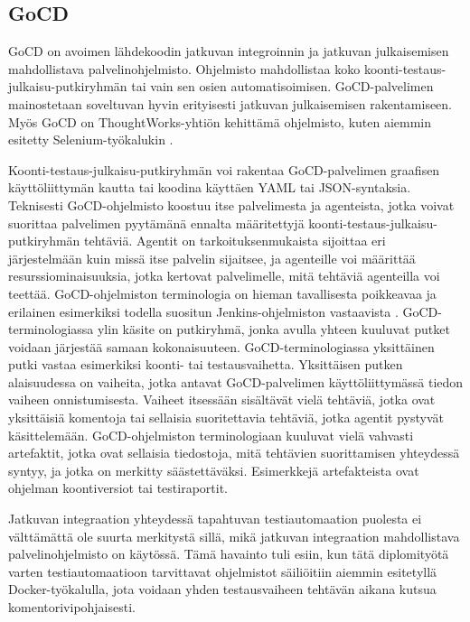   \subsection{GoCD} \label{ch:08_gocd}

    GoCD on avoimen lähdekoodin jatkuvan integroinnin ja jatkuvan julkaisemisen mahdollistava palvelinohjelmisto.
    Ohjelmisto mahdollistaa koko koonti-testaus-julkaisu-putkiryhmän tai vain sen osien automatisoimisen.
    GoCD-palvelimen mainostetaan soveltuvan hyvin erityisesti jatkuvan julkaisemisen rakentamiseen.
    Myös GoCD on ThoughtWorks-yhtiön kehittämä ohjelmisto, kuten aiemmin esitetty Selenium-työkalukin \parencite{gocd_info}.

    Koonti-testaus-julkaisu-putkiryhmän voi rakentaa GoCD-palvelimen graafisen käyttöliittymän kautta tai koodina käyttäen YAML tai JSON-syntaksia.
    Teknisesti GoCD-ohjelmisto koostuu itse palvelimesta ja agenteista, jotka voivat suorittaa palvelimen pyytämänä ennalta määritettyjä koonti-testaus-julkaisu-putkiryhmän tehtäviä.
    Agentit on tarkoituksenmukaista sijoittaa eri järjestelmään kuin missä itse palvelin sijaitsee, ja agenteille voi määrittää resurssiominaisuuksia, jotka kertovat palvelimelle, mitä tehtäviä agenteilla voi teettää.
    GoCD-ohjelmiston terminologia on hieman tavallisesta poikkeavaa ja erilainen esimerkiksi todella suositun Jenkins-ohjelmiston vastaavista \parencite{gocd_jenkins_terminology}.
    GoCD-terminologiassa ylin käsite on putkiryhmä, jonka avulla yhteen kuuluvat putket voidaan järjestää samaan kokonaisuuteen.
    GoCD-terminologiassa yksittäinen putki vastaa esimerkiksi koonti- tai testausvaihetta.
    Yksittäisen putken alaisuudessa on vaiheita, jotka antavat GoCD-palvelimen käyttöliittymässä tiedon vaiheen onnistumisesta.
    Vaiheet itsessään sisältävät vielä tehtäviä, jotka ovat yksittäisiä komentoja tai sellaisia suoritettavia tehtäviä, jotka agentit pystyvät käsittelemään.
    GoCD-ohjelmiston terminologiaan kuuluvat vielä vahvasti artefaktit, jotka ovat sellaisia tiedostoja, mitä tehtävien suorittamisen yhteydessä syntyy, ja jotka on merkitty säästettäväksi.
    Esimerkkejä artefakteista ovat ohjelman koontiversiot tai testiraportit.

    Jatkuvan integraation yhteydessä tapahtuvan testiautomaation puolesta ei välttämättä ole suurta merkitystä sillä, mikä jatkuvan integraation mahdollistava palvelinohjelmisto on käytössä.
    Tämä havainto tuli esiin, kun tätä diplomityötä varten testiautomaatioon tarvittavat ohjelmistot säiliöitiin aiemmin esitetyllä Docker-työkalulla, jota voidaan yhden testausvaiheen tehtävän aikana kutsua komentorivipohjaisesti.


